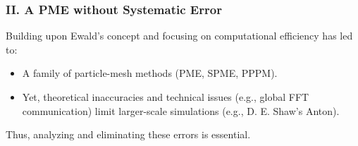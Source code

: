 \documentclass{beamer}
\begin{document}
	
	
	
	
	
	
	
	
	
	
	
	
	
	
	
	
	
	
	\begin{frame}
		\frametitle{II. A PME without Systematic Error}
		
		Building upon Ewald's concept and focusing on computational efficiency has led to:
		\vspace{0.6cm}
		
		\begin{itemize}
			\item A family of particle-mesh methods (PME, SPME, PPPM).
			\vspace{0.3cm}
			\item Yet, theoretical inaccuracies and technical issues (e.g., global FFT communication) limit larger-scale simulations (e.g., D. E. Shaw's Anton).
		\end{itemize}
		
		\vspace{0.6cm}
		Thus, analyzing and eliminating these errors is essential.
	\end{frame}
	
\end{document}
